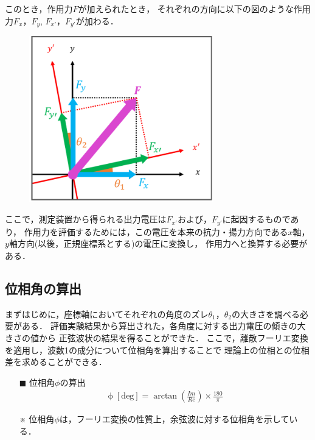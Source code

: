 \documentclass[twocolumn,a4j]{jsarticle}
\begin{document}
\newpage

このとき，作用力$F$が加えられたとき，
それぞれの方向に以下の図のような作用力$F_x$，$F_y$, $F_{x'}$，$F_{y'}$が加わる．

\begin{figure}[htbp]
    \footnotesize
    \begin{center}
        \includegraphics[width=80mm]{../images/image_2.png}
        \caption{}
    \end{center}
\end{figure}

ここで，測定装置から得られる出力電圧は$F_{x'}$および，$F_{y'}$に起因するものであり，
作用力を評価するためには，この電圧を本来の抗力・揚力方向である$x$軸，$y$軸方向(以後，正規座標系とする)の電圧に変換し，
作用力へと換算する必要がある．\\

\subsection{位相角の算出}
まずはじめに，座標軸においてそれぞれの角度のズレ$\theta_1$，$\theta_2$の大きさを調べる必要がある．
評価実験結果から算出された，各角度に対する出力電圧の傾きの大きさの値から
正弦波状の結果を得ることができた．
ここで，離散フーリエ変換を適用し，波数1の成分について位相角を算出することで
理論上の位相との位相差を求めることができる．

\begin{itemize}
    \item [$\blacksquare$] 位相角$\phi$の算出
    \begin{eqnarray*}
        \mathrm{\phi \; [deg]} = \arctan \left(\frac{Im}{Re}\right) × \frac{180}{\pi}
    \end{eqnarray*}    
    \item [※] 位相角$\phi$は，フーリエ変換の性質上，余弦波に対する位相角を示している．
\end{itemize}
\end{document}
